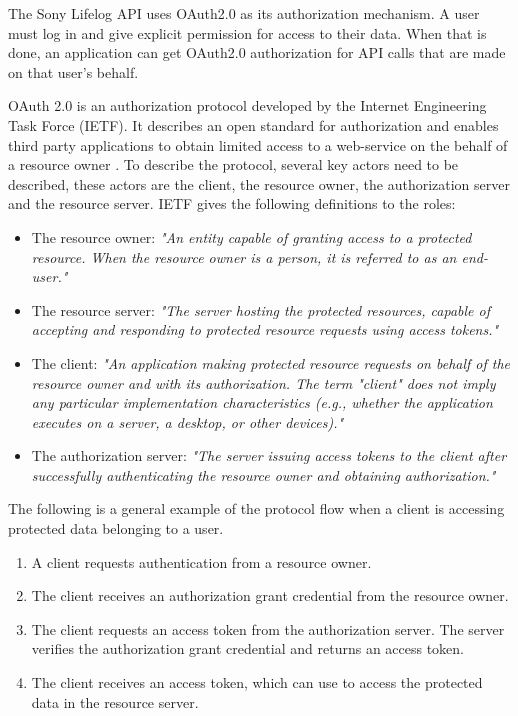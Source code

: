 \documentclass{cslthse-msc}
\begin{document}
The Sony Lifelog API uses OAuth2.0 as its authorization mechanism. A user must log in and give explicit permission for access to their data. When that is done, an application can get OAuth2.0 authorization for API calls that are made on that user’s behalf.

OAuth 2.0 is an authorization protocol developed by the Internet Engineering Task Force (IETF). It describes an open standard for authorization and enables third party applications to obtain limited access to a web-service on the behalf of a resource owner \cite{oauth2spec}. To describe the protocol, several key actors need to be described, these actors are the client, the resource owner, the authorization server and the resource server. IETF gives the following definitions to the roles:

\begin{itemize}
	\item The resource owner: \textit{"An entity capable of granting access to a protected resource. When the resource owner is a person, it is referred to as an end-user."}
	\item The resource server: \textit{"The server hosting the protected resources, capable of accepting and responding to protected resource requests using access tokens."}
	\item The client: \textit{"An application making protected resource requests on behalf of the resource owner and with its authorization. The term "client" does not imply any particular implementation characteristics (e.g., whether the application executes on a server, a desktop, or other devices)."}
	\item The authorization server: \textit{"The server issuing access tokens to the client after successfully authenticating the resource owner and obtaining authorization."}
\end{itemize}

The following is a general example of the protocol flow when a client is accessing protected data belonging to a user. 

\begin{enumerate}
	\item A client requests authentication from a resource owner. 
	\item The client receives an authorization grant credential from the resource owner.    
	\item The client requests an access token from the authorization server. The server verifies the authorization grant credential and returns an access token. 
	\item The client receives an access token, which can use to access the protected data in the resource server. 
\end{enumerate}
\end{document}
